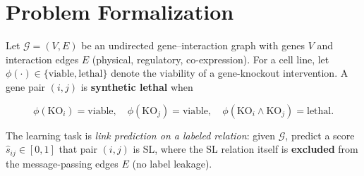 \documentclass[11pt]{article}
\newcommand{\KO}{\mathrm{KO}}
\begin{document}
\section{Problem Formalization}

Let $\mathcal{G}=(V,E)$ be an undirected gene--interaction graph with genes
$V$ and interaction edges $E$ (physical, regulatory, co-expression). For a cell
line, let $\phi(\cdot)\in\{\text{viable},\text{lethal}\}$ denote the viability
of a gene-knockout intervention. A gene pair $(i,j)$ is \textbf{synthetic
lethal} when

\begin{equation}
\phi(\KO_i)=\text{viable},\quad
\phi(\KO_j)=\text{viable},\quad
\phi(\KO_i \wedge \KO_j)=\text{lethal}.
\label{eq:sl}
\end{equation}

The learning task is \emph{link prediction on a labeled relation}: given
$\mathcal{G}$, predict a score $\hat{s}_{ij}\in[0,1]$ that pair $(i,j)$ is SL,
where the SL relation itself is \textbf{excluded} from the message-passing
edges $E$ (no label leakage).
\end{document}
